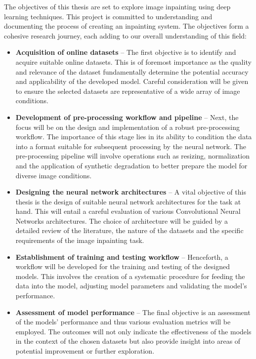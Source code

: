 The objectives of this thesis are set to explore image inpainting using deep learning techniques. This project is committed to understanding and documenting the process of creating an inpainting system. The objectives form a cohesive research journey, each adding to our overall understanding of this field:
\begin{itemize}[leftmargin=1.5em]
    \setlength\itemsep{0.2cm}

    \item \textbf{Acquisition of online datasets} -- The first objective is to identify and acquire suitable online datasets. This is of foremost importance as the quality and relevance of the dataset fundamentally determine the potential accuracy and applicability of the developed model. Careful consideration will be given to ensure the selected datasets are representative of a wide array of image conditions.

    \item \textbf{Development of pre-processing workflow and pipeline} -- Next, the focus will be on the design and implementation of a robust pre-processing workflow. The importance of this stage lies in its ability to condition the data into a format suitable for subsequent processing by the neural network. The pre-processing pipeline will involve operations such as resizing, normalization and the application of synthetic degradation to better prepare the model for diverse image conditions.

    \item \textbf{Designing the neural network architectures} -- A vital objective of this thesis is the design of suitable neural network architectures for the task at hand. This will entail a careful evaluation of various Convolutional Neural Networks architectures. The choice of architecture will be guided by a detailed review of the literature, the nature of the datasets and the specific requirements of the image inpainting task.

    \item \textbf{Establishment of training and testing workflow} -- Henceforth, a workflow will be developed for the training and testing of the designed models. This involves the creation of a systematic procedure for feeding the data into the model, adjusting model parameters and validating the model's performance.

    \item \textbf{Assessment of model performance} -- The final objective is an assessment of the models' performance and thus various evaluation metrics will be employed. The outcomes will not only indicate the effectiveness of the models in the context of the chosen datasets but also provide insight into areas of potential improvement or further exploration.
\end{itemize}
